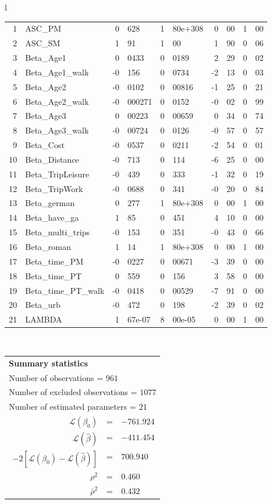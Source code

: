 \begin{tabular}{l}
\begin{tabular}{rlr@{.}lr@{.}lr@{.}lr@{.}l}
1 & ASC_PM  & 0&628 & 1&80e+308 & 0&00 & 1&00\\
2 & ASC_SM & 1&91 & 1&00 & 1&90 & 0&06\\
3 & Beta_Age1 & 0&0433 & 0&0189 & 2&29 & 0&02\\
4 & Beta_Age1_walk & -0&156 & 0&0734 & -2&13 & 0&03\\
5 & Beta_Age2 & -0&0102 & 0&00816 & -1&25 & 0&21\\
6 & Beta_Age2_walk & -0&000271 & 0&0152 & -0&02 & 0&99\\
7 & Beta_Age3 & 0&00223 & 0&00659 & 0&34 & 0&74\\
8 & Beta_Age3_walk & -0&00724 & 0&0126 & -0&57 & 0&57\\
9 & Beta_Cost & -0&0537 & 0&0211 & -2&54 & 0&01\\
10 & Beta_Distance & -0&713 & 0&114 & -6&25 & 0&00\\
11 & Beta_TripLeisure & -0&439 & 0&333 & -1&32 & 0&19\\
12 & Beta_TripWork & -0&0688 & 0&341 & -0&20 & 0&84\\
13 & Beta_german & 0&277 & 1&80e+308 & 0&00 & 1&00\\
14 & Beta_have_ga & 1&85 & 0&451 & 4&10 & 0&00\\
15 & Beta_multi_trips & -0&153 & 0&351 & -0&43 & 0&66\\
16 & Beta_roman & 1&14 & 1&80e+308 & 0&00 & 1&00\\
17 & Beta_time_PM & -0&0227 & 0&00671 & -3&39 & 0&00\\
18 & Beta_time_PT & 0&559 & 0&156 & 3&58 & 0&00\\
19 & Beta_time_PT_walk & -0&0418 & 0&00529 & -7&91 & 0&00\\
20 & Beta_urb & -0&472 & 0&198 & -2&39 & 0&02\\
21 & LAMBDA & 1&67e-07 & 8&00e-05 & 0&00 & 1&00\\
\hline
\end{tabular}
\\
\begin{tabular}{rcl}
\multicolumn{3}{l}{\bf Summary statistics}\\
\multicolumn{3}{l}{ Number of observations = $961$} \\
\multicolumn{3}{l}{ Number of excluded observations = $1077$} \\
\multicolumn{3}{l}{ Number of estimated  parameters = $21$} \\
 $\mathcal{L}(\beta_0)$ &=&  $-761.924$ \\
 $\mathcal{L}(\hat{\beta})$ &=& $-411.454 $  \\
 $-2[\mathcal{L}(\beta_0) -\mathcal{L}(\hat{\beta})]$ &=& $700.940$ \\
    $\rho^2$ &=&   $0.460$ \\
    $\bar{\rho}^2$ &=&    $0.432$ \\
\end{tabular}
  \end{tabular}
